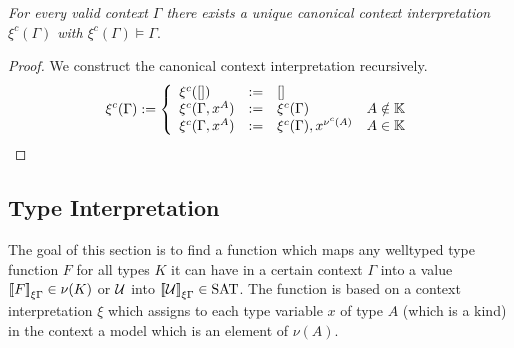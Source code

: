 \begin{theorem}
    \label{CanonicalContextInterpretation}
    \emph{For every valid context $\Gamma$ there exists a unique canonical
    context interpretation $\xi^c(\Gamma)$ with $\xi^c(\Gamma) \vDash \Gamma$}.
    \begin{proof}
        We construct the canonical context interpretation recursively.
        $$
        \xi^c(\Gamma)
        :=
        \left\{
            \begin{array}{llll}
                \xi^c([]) &:=& []
                \\
                \xi^c(\Gamma,x^A) &:=& \xi^c(\Gamma)
                & A \notin \mathbb{K}
                \\
                \xi^c(\Gamma,x^A) &:=& \xi^c(\Gamma),x^{\nu^c(A)}
                & A \in \mathbb{K}
            \end{array}
        \right.
        $$
    \end{proof}
\end{theorem}






\subsection{Type Interpretation}

The goal of this section is to find a function which maps any welltyped type
function $F$
for all types $K$ it can have in a certain context $\Gamma$ into a value
${{[\![} F{]\!]}}_{\xi\Gamma} \in \nu (K)$ or ${\cal U}$ into
${{[\![} {\cal U}{]\!]}}_{\xi\Gamma} \in \text{SAT}$. The function is based on a context
interpretation $\xi$ which assigns to each type variable $x$ of type $A$ (which
is a kind) in the context a model which is an element of $\nu(A)$.

